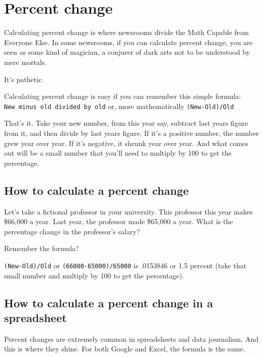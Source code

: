 \documentclass[
]{book}
\begin{document}
\hypertarget{percent-change}{%
\chapter{Percent change}\label{percent-change}}

Calculating percent change is where newsrooms divide the Math Capable from Everyone Else. In some newsrooms, if you can calculate percent change, you are seen as some kind of magician, a conjurer of dark arts not to be understood by mere mortals.

It's pathetic.

Calculating percent change is easy if you can remember this simple formula: \texttt{New\ minus\ old\ divided\ by\ old} or, more mathematically \texttt{(New-Old)/Old}

That's it. Take your new number, from this year say, subtract last years figure from it, and then divide by last years figure. If it's a positive number, the number grew year over year. If it's negative, it shrunk year over year. And what comes out will be a small number that you'll need to multiply by 100 to get the percentage.

\hypertarget{how-to-calculate-a-percent-change}{%
\section{How to calculate a percent change}\label{how-to-calculate-a-percent-change}}

Let's take a fictional professor in your university. This professor this year makes \$66,000 a year. Last year, the professor made \$65,000 a year. What is the percentage change in the professor's salary?

Remember the formula?

\texttt{(New-Old)/Old} or \texttt{(66000-65000)/65000} is .0153846 or 1.5 percent (take that small number and multiply by 100 to get the percentage).

\hypertarget{how-to-calculate-a-percent-change-in-a-spreadsheet}{%
\section{How to calculate a percent change in a spreadsheet}\label{how-to-calculate-a-percent-change-in-a-spreadsheet}}

Percent changes are extremely common in spreadsheets and data journalism. And this is where they shine. For both Google and Excel, the formula is the same.
\end{document}
